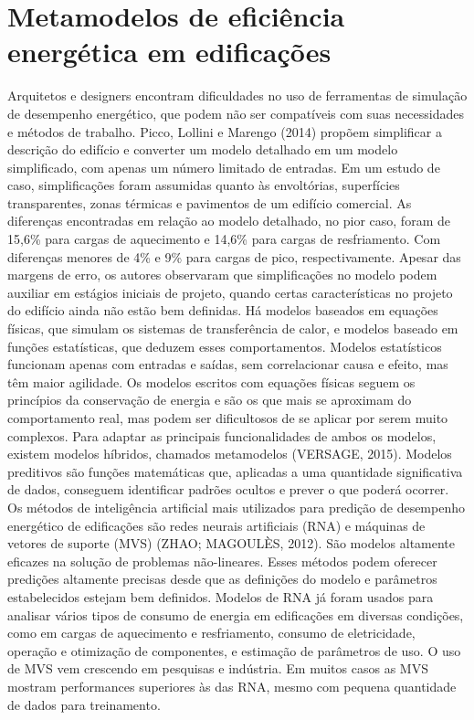 \documentclass[brazil,hardcopy,openany,a5paper]{ufscthesis}
\begin{document}
	\section{Metamodelos de eficiência energética em edificações}
	Arquitetos e designers encontram dificuldades no uso de ferramentas de simulação de desempenho energético, que podem não ser compatíveis com suas necessidades e métodos de trabalho. Picco, Lollini e Marengo (2014) propõem simplificar a descrição do edifício e converter um modelo detalhado em um modelo simplificado, com apenas um número limitado de entradas. Em um estudo de caso, simplificações foram assumidas quanto às envoltórias, superfícies transparentes, zonas térmicas e pavimentos de um edifício comercial. As diferenças encontradas em relação ao modelo detalhado, no pior caso, foram de 15,6\% para cargas de aquecimento e 14,6\% para cargas de resfriamento. Com diferenças menores de 4\% e 9\% para cargas de pico, respectivamente. Apesar das margens de erro, os autores observaram que simplificações no modelo podem auxiliar em estágios iniciais de projeto, quando certas características no projeto do edifício ainda não estão bem definidas.
	Há modelos baseados em equações físicas, que simulam os sistemas de transferência de calor, e modelos baseado em funções estatísticas, que
	deduzem esses comportamentos. Modelos estatísticos funcionam apenas com entradas e saídas, sem correlacionar causa e efeito, mas têm maior agilidade. 
	Os modelos escritos com equações físicas seguem os princípios da conservação de energia e são os que mais se aproximam do comportamento real, mas podem ser dificultosos de se aplicar por serem muito complexos. Para adaptar as principais funcionalidades de ambos os modelos, existem modelos híbridos, chamados metamodelos (VERSAGE, 2015).
	Modelos preditivos são funções matemáticas que, aplicadas a uma quantidade significativa de dados, conseguem identificar padrões ocultos e prever o que poderá ocorrer. Os métodos de inteligência artificial mais utilizados para predição de desempenho energético de edificações são redes neurais artificiais (RNA) e máquinas de vetores de suporte (MVS) (ZHAO; MAGOULÈS, 2012). São modelos altamente eficazes na solução de problemas não-lineares. Esses métodos podem oferecer predições altamente precisas desde que as definições do modelo e parâmetros estabelecidos estejam bem definidos. Modelos de RNA já foram usados para analisar vários tipos de consumo de energia em edificações em diversas condições, como em cargas de aquecimento e resfriamento, consumo de eletricidade, operação e otimização de componentes, e estimação de parâmetros de uso. O uso de MVS vem crescendo em pesquisas e indústria. Em muitos casos as MVS mostram performances superiores às das RNA, mesmo com pequena quantidade de dados para treinamento.
\end{document}
